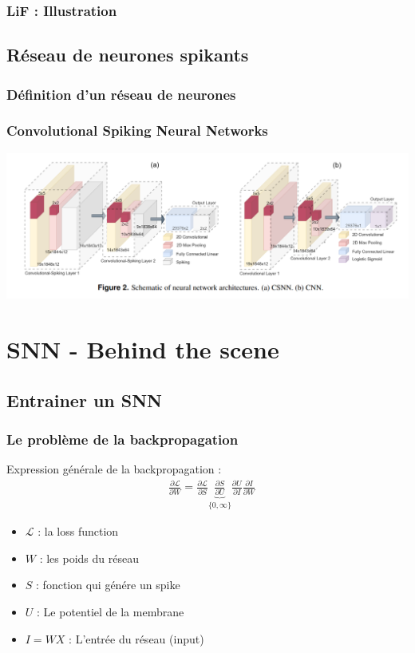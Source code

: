 \documentclass[aspectratio=169]{beamer}
\begin{document}
\begin{frame}
  \frametitle{LiF : Illustration}
  

\end{frame}

\subsection{Réseau de neurones spikants}

\begin{frame}
  \frametitle{Définition d'un réseau de neurones}


\end{frame}

\begin{frame}
  \frametitle{Convolutional Spiking Neural Networks}

  \begin{center}
    \includegraphics[width=\textwidth]{image/Convo.png}
  \end{center}

\end{frame}

\section{SNN - Behind the scene}

\subsection{Entrainer un SNN}

\begin{frame}
  \frametitle{Le problème de la backpropagation}
  Expression générale de la backpropagation :
  $$
    \begin{aligned}
       & \frac{\partial \mathcal{L}}{\partial W} =
      \frac{\partial \mathcal{L}}{\partial S}
      \underbrace{\frac{\partial S}{\partial U}}_{\{0, \infty\}}
      \frac{\partial U}{\partial I}
      \frac{\partial I}{\partial W}
    \end{aligned}
  $$

  \begin{itemize}
    \item $\mathcal{L}$ : la loss function
    \item $W$ : les poids du réseau
    \item $S$ : fonction qui génére un spike
    \item $U$ : Le potentiel de la membrane
    \item $I = WX$ : L'entrée du réseau (input)
  \end{itemize}

\end{frame}
\end{document}
